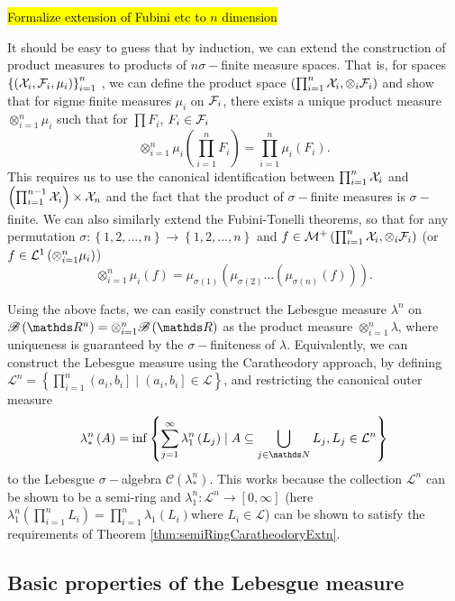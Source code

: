 \hl{Formalize extension of Fubini etc to $n$ dimension}

It should be easy to guess that by induction, we can extend the construction
of product measures to products of $n$$\sigma-$finite measure spaces.
That is, for spaces $\left\{ \left(\mathcal{X}_{i},\mathcal{F}_{i},\mu_{i}\right)\right\} _{i=1}^{n}$
, we can define the product space $\left(\prod_{i=1}^{n}\mathcal{X}_{i},\otimes_{i}\mathcal{F}_{i}\right)$
and show that for sigme finite measures $\mu_{i}$ on $\mathcal{F}_{i}$, there
exists a unique product measure $\otimes_{i=1}^{n}\mu_{i}$ such that
for $\prod F_{i}$, $F_{i}\in\mathcal{F}_{i}$
\[
\otimes_{i=1}^{n}\mu_{i}\left(\prod_{i=1}^{n}F_{i}\right)=\prod_{i=1}^{n}\mu_{i}\left(F_{i}\right).
\]
This requires us to use the canonical identification between $\prod_{i=1}^{n}\mathcal{X}_{i}$
and $\left(\prod_{i=1}^{n-1}\mathcal{X}_{i}\right)\times\mathcal{X}_{n}$ and the fact
that the product of $\sigma-$finite measures is $\sigma-$finite.
We can also similarly extend the Fubini-Tonelli theorems, so that
for any permutation $\sigma:\left\{ 1,2,\dots,n\right\} \to\left\{ 1,2,\ldots,n\right\} $
and $f\in\mathcal{M}^{+}\left(\prod_{i=1}^{n}\mathcal{X}_{i},\otimes_{i}\mathcal{F}_{i}\right)$
(or $f\in\mathcal{L}^{1}\left(\otimes_{i=1}^{n}\mu_{i}\right)$)
\[
\otimes_{i=1}^{n}\mu_{i}\left(f\right)=\mu_{\sigma\left(1\right)}\left(\mu_{\sigma\left(2\right)}\ldots\left(\mu_{\sigma\left(n\right)}\left(f\right)\right)\right).
\]

Using the above facts, we can easily construct the Lebesgue measure
$\lambda^{n}$ on $\borel\left(\R^{n}\right)=\otimes_{i=1}^{n}\borel\left(\R\right)$
as the product measure $\otimes_{i=1}^{n}\lambda$, where uniqueness
is guaranteed by the $\sigma-$finiteness of $\lambda$. Equivalently,
we can construct the Lebesgue measure using the Caratheodory approach,
by defining $\mathcal{L}^{n}=\left\{ \prod_{i=1}^{n}\left(a_{i},b_{i}\right]\mid\left(a_{i},b_{i}\right]\in\mathcal{L}\right\} $,
and restricting the canonical outer measure
\[
\lambda_{*}^{n}\left(A\right)=\inf\left\{ \sum_{j=1}^{\infty}\lambda_{1}^{n}\left(L_{j}\right)\mid A\subseteq\bigcup_{j\in\N}L_{j},L_{j}\in\mathcal{L}^{n}\right\} 
\]
to the Lebesgue $\sigma-$algebra $\mathcal{C}\left(\lambda_{*}^{n}\right)$.
This works because the collection $\mathcal{L}^{n}$ can be shown
to be a semi-ring and $\lambda_{1}^{n}:\mathcal{L}^{n}\to\left[0,\infty\right]$
(here $\lambda_{1}^{n}\left(\prod_{i=1}^{n}L_{i}\right)=\prod_{i=1}^{n}\lambda_{1}\left(L_{i}\right)$where
$L_{i}\in\mathcal{L}$) can be shown to satisfy the requirements of
Theorem \ref{thm:semiRingCaratheodoryExtn}.

\subsection{Basic properties of the Lebesgue measure\label{subsec:lebesgueRNproperties}}

